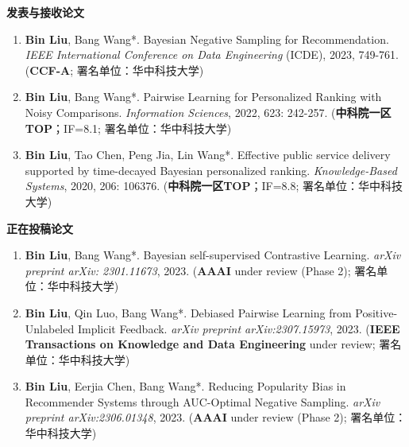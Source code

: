\begin{publications}
\noindent
\textbf{发表与接收论文}
\renewcommand{\labelenumi}{[\arabic{enumi}]}
\begin{enumerate}
\item \textbf{Bin Liu}, Bang Wang*. Bayesian Negative Sampling for Recommendation. \textit{IEEE International Conference on Data Engineering} (ICDE), 2023, 749-761. (\textbf{CCF-A}; 署名单位：华中科技大学)

\item \textbf{Bin Liu}, Bang Wang*. Pairwise Learning for Personalized Ranking with Noisy Comparisons. \textit{Information Sciences}, 2022, 623: 242-257. (\textbf{中科院一区TOP}；IF=8.1; 署名单位：华中科技大学)
\item \textbf{Bin Liu}, Tao Chen, Peng Jia, Lin Wang*. Effective public service delivery supported by time-decayed Bayesian personalized ranking. \textit{Knowledge-Based Systems}, 2020, 206: 106376. (\textbf{中科院一区TOP}；IF=8.8; 署名单位：华中科技大学)
\end{enumerate}

\noindent
\textbf{正在投稿论文}
\begin{enumerate}
\item \textbf{Bin Liu}, Bang Wang*. Bayesian self-supervised Contrastive Learning. \textit{arXiv preprint arXiv: 2301.11673}, 2023. (\textbf{AAAI} under review (Phase 2); 署名单位：华中科技大学)
\item \textbf{Bin Liu}, Qin Luo, Bang Wang*. Debiased Pairwise Learning from Positive-Unlabeled Implicit Feedback. \textit{arXiv preprint arXiv:2307.15973}, 2023. (\textbf{IEEE Transactions on Knowledge and Data Engineering} under review; 署名单位：华中科技大学)
\item \textbf{Bin Liu}, Eerjia Chen, Bang Wang*. Reducing Popularity Bias in Recommender Systems through AUC-Optimal Negative Sampling. \textit{arXiv preprint arXiv:2306.01348}, 2023. (\textbf{AAAI} under review (Phase 2); 署名单位：华中科技大学)

\end{enumerate}
\end{publications}
